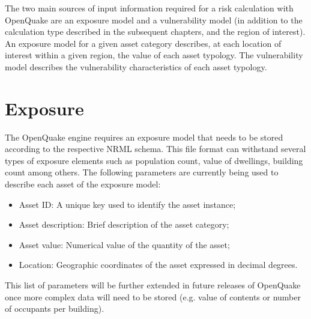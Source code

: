 The two main sources of input information required for a risk calculation with OpenQuake are an exposure model and a vulnerability model (in addition to the calculation type described in the subsequent chapters, and the region of interest). An exposure model for a given asset category describes, at each location of interest within a given region, the value of each asset typology. The vulnerability model describes the vulnerability characteristics of each asset typology.
\section{Exposure}
The OpenQuake engine requires an exposure model that needs to be stored according to the respective NRML schema. This file format can withstand several types of exposure elements such as population count, value of dwellings, building count among others. The following parameters are currently being used to describe each asset of the exposure model: 

\begin{itemize}
\item Asset ID: A unique key used to identify the asset instance;
\item Asset description: Brief description of the asset category;
\item Asset value: Numerical value of the quantity of the asset;
\item Location: Geographic coordinates of the asset expressed in decimal degrees.
\end{itemize}

This list of parameters will be further extended in future releases of OpenQuake once more complex data will need to be stored (e.g. value of contents or number of occupants per building).  

